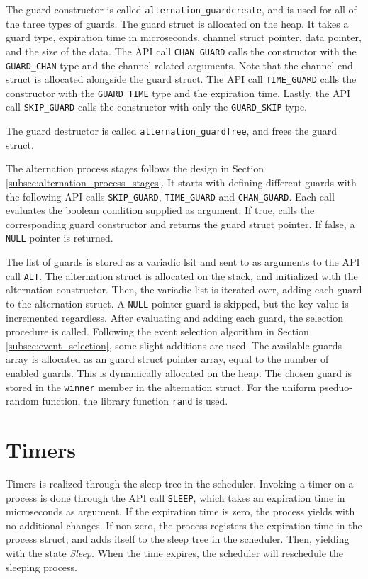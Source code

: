 The guard constructor is called \texttt{alternation\_guardcreate}, and is used for all of the three types of guards. The guard struct is allocated on the heap. It takes a guard type, expiration time in microseconds, channel struct pointer, data pointer, and the size of the data. The API call \texttt{CHAN\_GUARD} calls the constructor with the \texttt{GUARD\_CHAN} type and the channel related arguments. Note that the channel end struct is allocated alongside the guard struct. The API call \texttt{TIME\_GUARD} calls the constructor with the \texttt{GUARD\_TIME} type and the expiration time. Lastly, the API call \texttt{SKIP\_GUARD} calls the constructor with only the \texttt{GUARD\_SKIP} type. 

The guard destructor is called \texttt{alternation\_guardfree}, and frees the guard struct.

The alternation process stages follows the design in Section \ref{subsec:alternation_process_stages}. It starts with defining different guards with the following API calls \texttt{SKIP\_GUARD}, \texttt{TIME\_GUARD} and \texttt{CHAN\_GUARD}. Each call evaluates the boolean condition supplied as argument. If true, calls the corresponding guard constructor and returns the guard struct pointer. If false, a \texttt{NULL} pointer is returned. 

The list of guards is stored as a variadic lsit and sent to as arguments to the API call \texttt{ALT}. The alternation struct is allocated on the stack, and initialized with the alternation constructor. Then, the variadic list is iterated over, adding each guard to the alternation struct. A \texttt{NULL} pointer guard is skipped, but the key value is incremented regardless. After evaluating and adding each guard, the selection procedure is called. Following the event selection algorithm in Section \ref{subsec:event_selection}, some slight additions are used. The available guards array is allocated as an guard struct pointer array, equal to the number of enabled guards. This is dynamically allocated on the heap. The chosen guard is stored in the \texttt{winner} member in the alternation struct. For the uniform pseduo\hyp{}random function, the library function \texttt{rand} is used.

\section{Timers}

Timers is realized through the sleep tree in the scheduler. Invoking a timer on a process is done through the API call \texttt{SLEEP}, which takes an expiration time in microseconds as argument. If the expiration time is zero, the process yields with no additional changes. If non\hyp{}zero, the process registers the expiration time in the process struct, and adds itself to the sleep tree in the scheduler. Then, yielding with the state \textit{Sleep}. When the time expires, the scheduler will reschedule the sleeping process.

